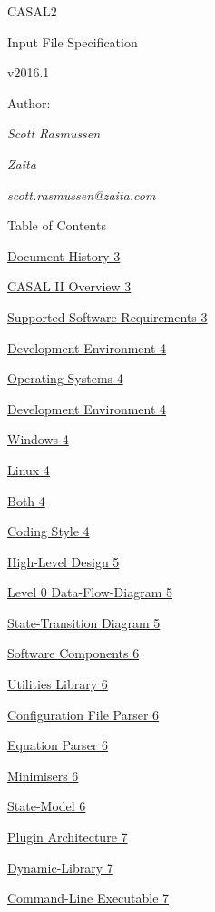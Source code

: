 \documentclass[a4paper,11pt,twoside,pdftex,draft]{article}
\date{}
\begin{document}
CASAL2

Input File Specification

v2016.1

Author:

\emph{Scott Rasmussen}

\emph{Zaita}

\emph{scott.rasmussen@zaita.com}

Table of Contents

\protect\hyperlink{document-history}{Document History 3}

\protect\hyperlink{file-format-overview}{CASAL II Overview 3}

\protect\hyperlink{keywords-and-reserved-characters}{Supported Software
Requirements 3}

\protect\hyperlink{__RefHeading__140_571873561}{Development Environment
4}

\protect\hyperlink{operating-systems}{Operating Systems 4}

\protect\hyperlink{development-environment}{Development Environment 4}

\protect\hyperlink{windows}{Windows 4}

\protect\hyperlink{linux}{Linux 4}

\protect\hyperlink{both}{Both 4}

\protect\hyperlink{coding-style}{Coding Style 4}

\protect\hyperlink{high-level-design}{High-Level Design 5}

\protect\hyperlink{level-0-data-flow-diagram}{Level 0 Data-Flow-Diagram
5}

\protect\hyperlink{state-transition-diagram}{State-Transition Diagram 5}

\protect\hyperlink{software-components}{Software Components 6}

\protect\hyperlink{utilities-library}{Utilities Library 6}

\protect\hyperlink{configuration-file-parser}{Configuration File Parser
6}

\protect\hyperlink{equation-parser}{Equation Parser 6}

\protect\hyperlink{minimisers}{Minimisers 6}

\protect\hyperlink{state-model}{State-Model 6}

\protect\hyperlink{plugin-architecture}{Plugin Architecture 7}

\protect\hyperlink{dynamic-library}{Dynamic-Library 7}

\protect\hyperlink{command-line-executable}{Command-Line Executable 7}
\end{document}
